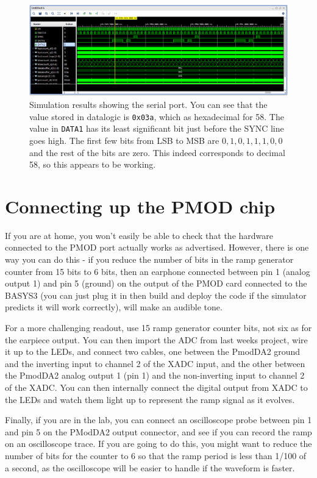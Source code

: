 \documentclass[../physical_computing.tex]{subfiles}
\begin{document}
\begin{figure}[htbp]
    \centering
    \includegraphics[width=1.0\textwidth]{figures/simlong.png}
    \caption{Simulation results showing the serial port. You can see that
    the value stored in datalogic is \texttt{0x03a}, which as
    hexadecimal for 58. The value in \texttt{DATA1} has its least 
    significant bit just before the SYNC line goes high. The first
    few bits from LSB to MSB are $0,1,0,1,1,1,0,0$ and the rest of the
    bits are zero. This indeed corresponds to decimal 58, so this
    appears to be working.}
    \label{fig:simlong}
\end{figure}

\section{Connecting up the PMOD chip}
\label{sec:connections}

If you are at home, you won't easily be able to check that the hardware
connected to the PMOD port actually works as advertised. However, there is
one way you can do this - if you reduce the number of bits in the ramp
generator counter from 15 bits to 6 bits, then an earphone connected between pin 1
(analog output 1) and pin 5 (ground) on the output of the PMOD card connected
to the BASYS3 (you can just plug it in then build and deploy the code
if the simulator predicts it will work correctly), will make an audible tone.

For a more challenging readout, use 15 ramp generator counter bits, not 
six as for the earpiece output. You can then import the ADC from last weeks 
project, wire it up to the LEDs, and connect two cables, one between 
the PmodDA2 ground and the inverting input to channel 2 of the XADC 
input, and the other between the PmodDA2 analog output 1 (pin 1) and the
non-inverting input to channel 2 of the XADC. You can then internally 
connect the digital output from XADC to the LEDs and watch them light 
up to represent the ramp signal as it evolves.

Finally, if you are in the lab, you can connect an oscilloscope probe between
pin 1 and pin 5 on the PModDA2 output connector, and see if you can record the 
ramp on an oscilloscope trace. If you are going to do this, you might want to
reduce the number of bits for the counter to 6 so that the ramp period is 
less than 1/100 of a second, as the oscilloscope will be easier to handle
if the waveform is faster.
\end{document}
